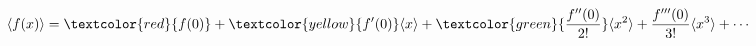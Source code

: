 \documentclass[preview]{standalone}
\begin{document}
\begin{align*}
\langle f(x) \rangle = \textcolor{red}{f(0)} + \textcolor{yellow}{f'(0)}\langle x \rangle + \textcolor{green}{\frac{f''(0)}{2!}}\langle x^2 \rangle + \frac{f'''(0)}{3!}\langle x^3 \rangle + \cdots
\end{align*}
\end{document}
